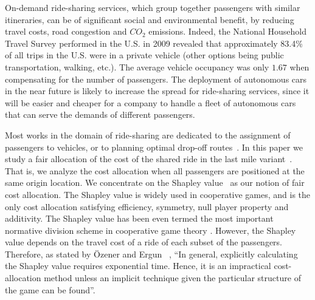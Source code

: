 \documentclass[sigconf]{aamas}
\begin{document}
On-demand ride-sharing services, which group together passengers with similar itineraries, can be of significant social and environmental benefit, by reducing travel costs, road congestion and $CO_2$ emissions. 
Indeed, the National Household Travel Survey performed in the U.S. in 2009 \cite{santos2011summary} revealed that approximately 83.4\% of all trips in the U.S. were in a private vehicle (other options being public transportation, walking, etc.). The average vehicle occupancy was only $1.67$ when compensating for the number of passengers. %
The deployment of autonomous cars in the near future is likely to increase the spread for ride-sharing services, since it will be easier and cheaper for a company to handle a fleet of autonomous cars that can serve the demands of different passengers.

Most works in the domain of ride-sharing are dedicated to the assignment of passengers to vehicles, or to planning optimal drop-off routes~\cite{psaraftis2016dynamic,Alonso-Mora462,molenbruch2017}.
In this paper we study a fair allocation of the cost of the shared ride in the last mile variant~\cite{cheng2014mechanisms}. That is, we analyze the cost allocation when all passengers are positioned at the same origin location. 
We concentrate on the Shapley value~\cite{shapley1953value} as our notion of fair cost allocation. The Shapley value is widely used in cooperative games, and is the only cost allocation satisfying efficiency, symmetry, null player property and additivity. 
The Shapley value has been even termed the most important normative division scheme in cooperative game theory \cite{winter2002shapley}. However, the Shapley value depends on the travel cost of a ride of each subset of the passengers.
Therefore, as stated by {\"O}zener and Ergun ~\cite{ozener2008allocating}, ``In general, explicitly calculating the Shapley value requires exponential time. Hence, it is an impractical cost-allocation method unless an implicit technique given the particular structure of the game can be found''.
\end{document}
